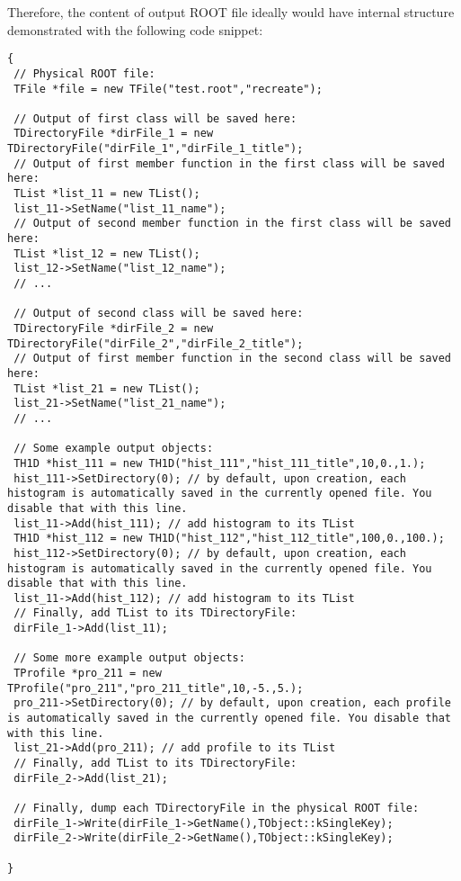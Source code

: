 \documentclass[11pt]{article}
\begin{document}
\noindent Therefore, the content of output ROOT file ideally would have internal structure demonstrated with the following code snippet:
%
{\tiny
\begin{verbatim}
{
 // Physical ROOT file:
 TFile *file = new TFile("test.root","recreate");

 // Output of first class will be saved here:
 TDirectoryFile *dirFile_1 = new TDirectoryFile("dirFile_1","dirFile_1_title");
 // Output of first member function in the first class will be saved here:
 TList *list_11 = new TList();
 list_11->SetName("list_11_name");
 // Output of second member function in the first class will be saved here:
 TList *list_12 = new TList();
 list_12->SetName("list_12_name");
 // ...

 // Output of second class will be saved here:
 TDirectoryFile *dirFile_2 = new TDirectoryFile("dirFile_2","dirFile_2_title");
 // Output of first member function in the second class will be saved here:
 TList *list_21 = new TList();
 list_21->SetName("list_21_name");
 // ...

 // Some example output objects:
 TH1D *hist_111 = new TH1D("hist_111","hist_111_title",10,0.,1.);
 hist_111->SetDirectory(0); // by default, upon creation, each histogram is automatically saved in the currently opened file. You disable that with this line.
 list_11->Add(hist_111); // add histogram to its TList
 TH1D *hist_112 = new TH1D("hist_112","hist_112_title",100,0.,100.);
 hist_112->SetDirectory(0); // by default, upon creation, each histogram is automatically saved in the currently opened file. You disable that with this line.
 list_11->Add(hist_112); // add histogram to its TList
 // Finally, add TList to its TDirectoryFile: 
 dirFile_1->Add(list_11);

 // Some more example output objects:
 TProfile *pro_211 = new TProfile("pro_211","pro_211_title",10,-5.,5.);
 pro_211->SetDirectory(0); // by default, upon creation, each profile is automatically saved in the currently opened file. You disable that with this line.
 list_21->Add(pro_211); // add profile to its TList
 // Finally, add TList to its TDirectoryFile: 
 dirFile_2->Add(list_21);

 // Finally, dump each TDirectoryFile in the physical ROOT file:
 dirFile_1->Write(dirFile_1->GetName(),TObject::kSingleKey);
 dirFile_2->Write(dirFile_2->GetName(),TObject::kSingleKey);

}
\end{verbatim}
}
%

\vspace{0.144cm}
\end{document}
